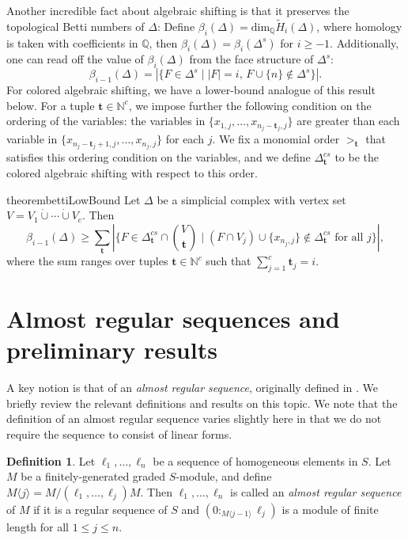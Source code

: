 \documentclass[a4paper, 10pt, reqno, english, ones]{amsart}  %
\theoremstyle{definition}
\newtheorem{definition}[theorem]{Definition}
\theoremstyle{remark}
\begin{document}
Another incredible fact about algebraic shifting is that it preserves the topological Betti numbers of $\Delta$: Define $\beta_i(\Delta) = \textrm{dim}_{\mathbb{Q}}\tilde{H}_i(\Delta)$, where homology is taken with coefficients in $\mathbb{Q}$, then $\beta_i(\Delta) = \beta_i(\Delta^s)$ for $i\geq -1$. Additionally, one can read off the value of $\beta_i(\Delta)$ from the face structure of $\Delta^s$:
\[
\beta_{i-1}(\Delta) = \left| \{ F\in \Delta^s \mid |F| = i,\, F\cup \{n\} \notin \Delta^s\} \right|.
\]
For colored algebraic shifting, we have a lower-bound analogue of this result below. For a tuple $\mathbf{t}\in \mathbb{N}^c$, we impose further the following condition on the ordering of the variables: the variables in $\{x_{1,j},\dots,x_{n_j-\mathbf{t}_j,j} \}$ are greater than each variable in $\{x_{n_j-\mathbf{t}_j+1,j},\dots,x_{n_j,j} \}$ for each $j$. We fix a monomial order $>_\mathbf{t}$ that satisfies this ordering condition on the variables, and we define $\Delta_{\mathbf{t}}^{cs}$ to be the colored algebraic shifting with respect to this order.

\begin{restatable}{theorem}{bettiLowBound}\label{thm:Betti lower bound}
Let $\Delta$ be a simplicial complex with vertex set $V=V_1\dot{\cup} \cdots \dot{\cup} V_c$. Then
\[
\beta_{i-1}(\Delta) \geq \sum_{\mathbf{t}}\left|\{ F\in \Delta_{\mathbf{t}}^{cs} \cap {V \choose \mathbf{t}} \mid (F\cap V_j)\cup \{x_{n_j,j}\}\notin \Delta_{\mathbf{t}}^{cs} \textrm{ for all } j \} \right|,
\]
where the sum ranges over tuples $\mathbf{t}\in \mathbb{N}^c$ such that $\sum_{j=1}^c\mathbf{t}_j=i$.
\end{restatable}

\section{Almost regular sequences and preliminary results}



A key notion is that of an \textit{almost regular sequence}, originally defined in \cite{aramova2000Almost}. We briefly review the relevant definitions and results on this topic. We note that the definition of an almost regular sequence varies slightly here in that we do not require the sequence to consist of linear forms.

\begin{definition}
    Let $\ell_1,\dots,\ell_n$ be a sequence of homogeneous elements in $S$. Let $M$ be a finitely-generated graded $S$-module, and define $M\langle j\rangle=M/(\ell_1,\dots,\ell_j)M$. Then $\ell_1,\dots,\ell_n$ is called an \textit{almost regular sequence} of $M$ if it is a regular sequence of $S$ and $(0:_{M\langle j-1 \rangle} \ell_j)$ is a module of finite length for all $1\leq j\leq n$. 
\end{definition}
\end{document}
